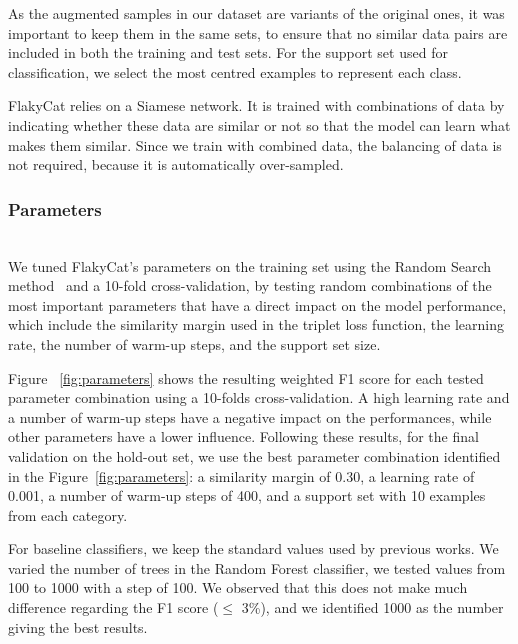 As the augmented samples in our dataset are variants of the original ones, it was important to keep them in the same sets, to ensure that no similar data pairs are included in both the training and test sets. For the support set used for classification, we select the most centred examples to represent each class. 

FlakyCat relies on a Siamese network. It is trained with combinations of data by indicating whether these data are similar or not so that the model can learn what makes them similar. Since we train with combined data, the balancing of data is not required, because it is automatically over-sampled.

\subsubsection{Parameters}
~~ \\
We tuned FlakyCat's parameters on the training set using the Random Search method~\cite{bergstra2012random} and a 10-fold cross-validation, by testing random combinations of the most important parameters that have a direct impact on the model performance, which include the similarity margin used in the triplet loss function, the learning rate, the number of warm-up steps, and the support set size.

Figure ~\ref{fig:parameters} shows the resulting weighted F1 score for each tested parameter combination using a 10-folds cross-validation. A high learning rate and a number of warm-up steps have a negative impact on the performances, while other parameters have a lower influence.  Following these results, for the final validation on the hold-out set, we use the best parameter combination identified in the Figure~\ref{fig:parameters}: a similarity margin of 0.30, a learning rate of 0.001, a number of warm-up steps of 400, and a support set with 10 examples from each category.

For baseline classifiers, we keep the standard values used by previous works. We varied the number of trees in the Random Forest classifier, we tested values from 100 to 1000 with a step of 100.
We observed that this does not make much difference regarding the F1 score ($\leq$ 3\%), and we identified 1000 as the number giving the best results. 

